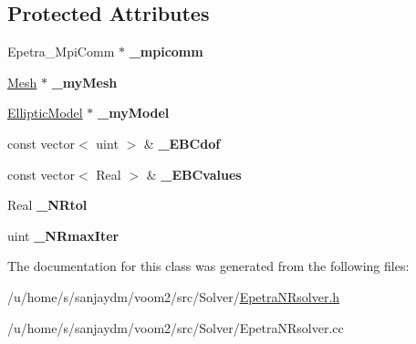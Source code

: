 \subsection*{Protected Attributes}
\begin{DoxyCompactItemize}
\item 
\hypertarget{classvoom_1_1_epetra_n_rsolver_a6a99fbbaa2940bbf07dc3b9d3015af54}{
Epetra\_\-MpiComm $\ast$ {\bfseries \_\-mpicomm}}
\label{classvoom_1_1_epetra_n_rsolver_a6a99fbbaa2940bbf07dc3b9d3015af54}

\item 
\hypertarget{classvoom_1_1_epetra_n_rsolver_ae6fae2326e4484ba1679872c318bf870}{
\hyperlink{classvoom_1_1_mesh}{Mesh} $\ast$ {\bfseries \_\-myMesh}}
\label{classvoom_1_1_epetra_n_rsolver_ae6fae2326e4484ba1679872c318bf870}

\item 
\hypertarget{classvoom_1_1_epetra_n_rsolver_a684645af12f7c7616220e04def39b5a9}{
\hyperlink{classvoom_1_1_elliptic_model}{EllipticModel} $\ast$ {\bfseries \_\-myModel}}
\label{classvoom_1_1_epetra_n_rsolver_a684645af12f7c7616220e04def39b5a9}

\item 
\hypertarget{classvoom_1_1_epetra_n_rsolver_a33db401ded52b5c31a658f73a59a0676}{
const vector$<$ uint $>$ \& {\bfseries \_\-EBCdof}}
\label{classvoom_1_1_epetra_n_rsolver_a33db401ded52b5c31a658f73a59a0676}

\item 
\hypertarget{classvoom_1_1_epetra_n_rsolver_a192734341c10256dbb7224781201ed92}{
const vector$<$ Real $>$ \& {\bfseries \_\-EBCvalues}}
\label{classvoom_1_1_epetra_n_rsolver_a192734341c10256dbb7224781201ed92}

\item 
\hypertarget{classvoom_1_1_epetra_n_rsolver_abdafbed36dea7a067ad04e1341f87757}{
Real {\bfseries \_\-NRtol}}
\label{classvoom_1_1_epetra_n_rsolver_abdafbed36dea7a067ad04e1341f87757}

\item 
\hypertarget{classvoom_1_1_epetra_n_rsolver_a7937cc5479f86c2f7b1907e55a66bc0f}{
uint {\bfseries \_\-NRmaxIter}}
\label{classvoom_1_1_epetra_n_rsolver_a7937cc5479f86c2f7b1907e55a66bc0f}

\end{DoxyCompactItemize}


The documentation for this class was generated from the following files:\begin{DoxyCompactItemize}
\item 
/u/home/s/sanjaydm/voom2/src/Solver/\hyperlink{_epetra_n_rsolver_8h}{EpetraNRsolver.h}\item 
/u/home/s/sanjaydm/voom2/src/Solver/EpetraNRsolver.cc\end{DoxyCompactItemize}
